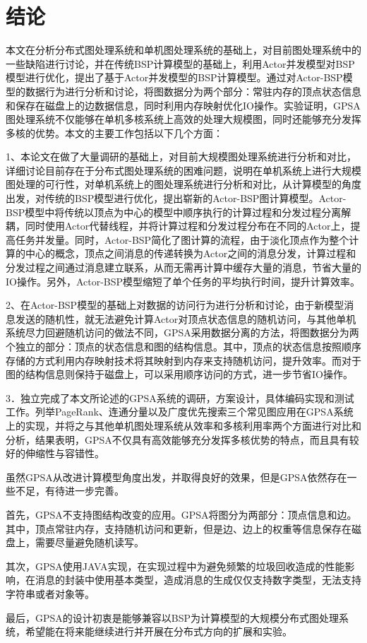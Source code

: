 
\chapter*{结\quad 论}

本文在分析分布式图处理系统和单机图处理系统的基础上，对目前图处理系统中的一些缺陷进行讨论，并在传统BSP计算模型的基础上，利用Actor并发模型对BSP模型进行优化，提出了基于Actor并发模型的BSP计算模型。通过对Actor-BSP模型的数据行为进行分析和讨论，将图数据分为两个部分：常驻内存的顶点状态信息和保存在磁盘上的边数据信息，同时利用内存映射优化IO操作。实验证明，GPSA图处理系统不仅能够在单机多核系统上高效的处理大规模图，同时还能够充分发挥多核的优势。本文的主要工作包括以下几个方面：

1、本论文在做了大量调研的基础上，对目前大规模图处理系统进行分析和对比，详细讨论目前存在于分布式图处理系统的困难问题，说明在单机系统上进行大规模图处理的可行性，对单机系统上的图处理系统进行分析和对比，从计算模型的角度出发，对传统的BSP模型进行优化，提出崭新的Actor-BSP图计算模型。Actor-BSP模型中将传统以顶点为中心的模型中顺序执行的计算过程和分发过程分离解耦，同时使用Actor代替线程，并将计算过程和分发过程分布在不同的Actor上，提高任务并发量。同时，Actor-BSP简化了图计算的流程，由于淡化顶点作为整个计算的中心的概念，顶点之间消息的传递转换为Actor之间的消息分发，计算过程和分发过程之间通过消息建立联系，从而无需再计算中缓存大量的消息，节省大量的IO操作。另外，Actor-BSP模型缩短了单个任务的平均执行时间，提升计算效率。

2、在Actor-BSP模型的基础上对数据的访问行为进行分析和讨论，由于新模型消息发送的随机性，就无法避免计算Actor对顶点状态信息的随机访问，与其他单机系统尽力回避随机访问的做法不同，GPSA采用数据分离的方法，将图数据分为两个独立的部分：顶点的状态信息和图的结构信息。其中，顶点的状态信息按照顺序存储的方式利用内存映射技术将其映射到内存来支持随机访问，提升效率。而对于图的结构信息则保持于磁盘上，可以采用顺序访问的方式，进一步节省IO操作。


3．独立完成了本文所论述的GPSA系统的调研，方案设计，具体编码实现和测试工作。列举PageRank、连通分量以及广度优先搜索三个常见图应用在GPSA系统上的实现，并将之与其他单机图处理系统从效率和多核利用率两个方面进行对比和分析，结果表明，GPSA不仅具有高效能够充分发挥多核优势的特点，而且具有较好的伸缩性与容错性。

虽然GPSA从改进计算模型角度出发，并取得良好的效果，但是GPSA依然存在一些不足，有待进一步完善。

首先，GPSA不支持图结构改变的应用。GPSA将图分为两部分：顶点信息和边。其中，顶点常驻内存，支持随机访问和更新，但是边、边上的权重等信息保存在磁盘上，需要尽量避免随机读写。

其次，GPSA使用JAVA实现，在实现过程中为避免频繁的垃圾回收造成的性能影响，在消息的封装中使用基本类型，造成消息的生成仅仅支持数字类型，无法支持字符串或者对象等。

最后，GPSA的设计初衷是能够兼容以BSP为计算模型的大规模分布式图处理系统，希望能在将来能继续进行并开展在分布式方向的扩展和实验。

